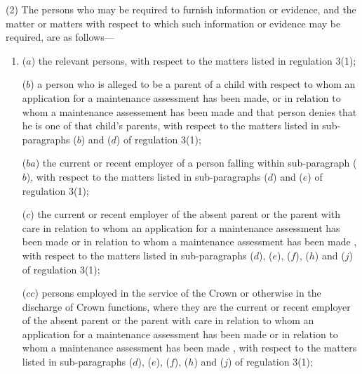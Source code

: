 \documentclass[a4paper,12pt]{article}
\begin{document}
(2) The persons who may be required to furnish information or evidence, and the matter or matters with respect to which such information or evidence may be required, are as follows—
\begin{enumerate}\item[]
($a$) the relevant persons, with respect to the matters listed in regulation 3(1);

($b$) a person who is alleged to be a parent of a child with respect to whom an application for a maintenance 
assessment has been made, or in relation to whom a maintenance assessement has been made 
and that person  %
denies that he is one of that child’s parents, with respect to the matters listed in sub-paragraphs ($b$) and ($d$) of regulation 3(1);

($ba$) the current or recent employer of a person falling within sub-\hspace{0pt}paragraph ($b$), with respect to the matters listed in sub-\hspace{0pt}paragraphs ($d$) and ($e$) of regulation 3(1);

($c$) the current or recent employer of the absent parent or the parent with care in relation to whom an application for a maintenance assessment has been made 
or in relation to whom a maintenance assessment has been made%
,  %
with respect to the matters listed in sub-paragraphs ($d$), ($e$), ($f$), ($h$) and ($j$) of regulation 3(1);

($cc$) persons employed in the service of the Crown or otherwise in the discharge of Crown functions, where they are the current or recent employer of the absent parent or the parent with care in relation to whom an application for a maintenance assessment has been made 
or in relation to whom a maintenance assessment has been made%
,  %
with respect to the matters listed in sub-paragraphs ($d$), ($e$), ($f$), ($h$) and ($j$) of regulation 3(1);


\end{enumerate}
\end{document}
